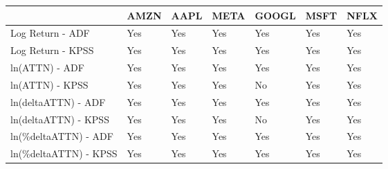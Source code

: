 \begin{tabular}{lllllll}
\toprule
{} & AMZN & AAPL & META & GOOGL & MSFT & NFLX \\
\midrule
Log Return - ADF      &  Yes &  Yes &  Yes &   Yes &  Yes &  Yes \\
Log Return - KPSS     &  Yes &  Yes &  Yes &   Yes &  Yes &  Yes \\
ln(ATTN) - ADF        &  Yes &  Yes &  Yes &   Yes &  Yes &  Yes \\
ln(ATTN) - KPSS       &  Yes &  Yes &  Yes &    No &  Yes &  Yes \\
ln(deltaATTN) - ADF   &  Yes &  Yes &  Yes &   Yes &  Yes &  Yes \\
ln(deltaATTN) - KPSS  &  Yes &  Yes &  Yes &    No &  Yes &  Yes \\
ln(\%deltaATTN) - ADF  &  Yes &  Yes &  Yes &   Yes &  Yes &  Yes \\
ln(\%deltaATTN) - KPSS &  Yes &  Yes &  Yes &   Yes &  Yes &  Yes \\
\bottomrule
\end{tabular}
